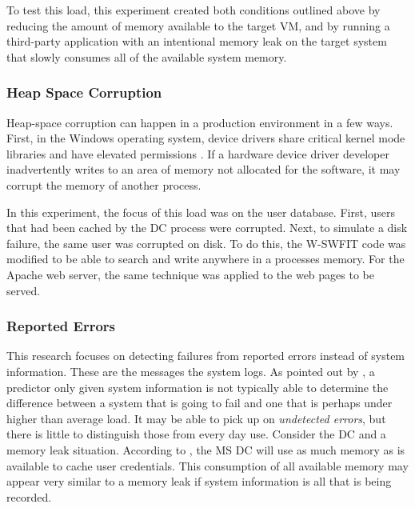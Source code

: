 To test this load, this experiment created both conditions outlined above by
reducing the amount of memory available to the target \ac{VM}, and by running a
third-party application with an intentional memory leak on the target system
that slowly consumes all of the available system memory.

\subsubsection{Heap Space Corruption} \label{sec:extHeapSpaceCorrupt}
Heap-space corruption can happen in a production environment in a few ways.
First, in the Windows operating system, device drivers share critical kernel
mode libraries and have elevated permissions \citep{russinovich2009}.  If a
hardware device driver developer inadvertently writes to an area of memory not
allocated for the software, it may corrupt the memory of another process.

In this experiment, the focus of this load was on the user database.  First,
users that had been cached by the \ac{DC} process were corrupted.  Next, to
simulate a disk failure, the same user was corrupted on disk.  To do this, the
\ac{W-SWFIT} code was modified to be able to search and write anywhere in a
processes memory.  For the Apache web server, the same technique was applied to
the web pages to be served.

\subsubsection{Reported Errors} \label{sec:extReportedErrors}
This research focuses on detecting failures from reported errors instead of
system information.  These are the messages the system logs.  As pointed out by
\citet{salfnerSurvey}, a predictor only given system information is not
typically able to determine the difference between a system that is going to
fail and one that is perhaps under higher than average load.  It may be able to
pick up on \emph{undetected errors}, but there is little to distinguish those
from every day use.  Consider the \ac{DC} and a memory leak situation.
According to \citet{russinovich2009}, the \ac{MS} \ac{DC} will use as much
memory as is available to cache user credentials.  This consumption of all
available memory may appear very similar to a memory leak if system information
is all that is being recorded.
